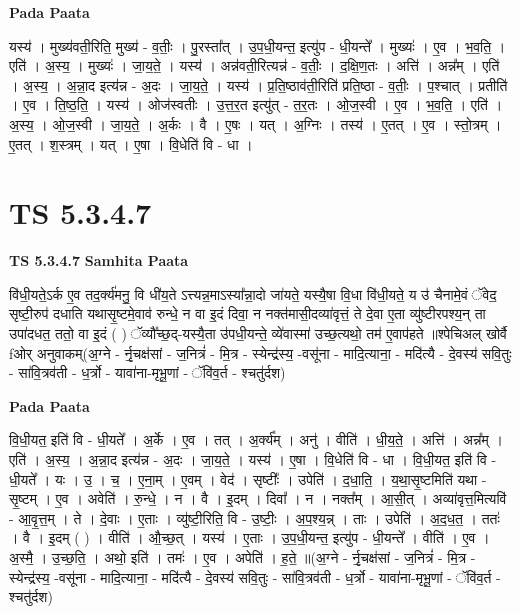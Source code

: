 \documentclass[17pt]{extarticle}
\begin{document}
\textbf{Pada Paata} \newline

यस्य॑ । मुख्य॑वती॒रिति॒ मुख्य॑ - व॒तीः॒ । पु॒रस्ता᳚त् । उ॒प॒धी॒यन्त॒ इत्यु॑प - धी॒यन्ते᳚ । मुख्यः॑ । ए॒व । भ॒व॒ति॒ । एति॑ । अ॒स्य॒ । मुख्यः॑ । जा॒य॒ते॒ । यस्य॑ । अन्न॑वती॒रित्यन्न॑ - व॒तीः॒ । द॒क्षि॒ण॒तः । अत्ति॑ । अन्न᳚म् । एति॑ । अ॒स्य॒ । अ॒न्ना॒द इत्य॑न्न - अ॒दः । जा॒य॒ते॒ । यस्य॑ । प्र॒ति॒ष्ठाव॑ती॒रिति॑ प्रति॒ष्ठा - व॒तीः॒ । प॒श्चात् । प्रतीति॑ । ए॒व । ति॒ष्ठ॒ति॒ । यस्य॑ । ओज॑स्वतीः । उ॒त्त॒र॒त इत्यु॑त् - त॒र॒तः । ओ॒ज॒स्वी । ए॒व । भ॒व॒ति॒ । एति॑ । अ॒स्य॒ । ओ॒ज॒स्वी । जा॒य॒ते॒ । अ॒र्कः । वै । ए॒षः । यत् । अ॒ग्निः । तस्य॑ । ए॒तत् । ए॒व । स्तो॒त्रम् । ए॒तत् । श॒स्त्रम् । यत् । ए॒षा । वि॒धेति॑ वि - धा ।  \newline





\section{ TS 5.3.4.7 }

\textbf{TS 5.3.4.7 } \newline
\textbf{Samhita Paata} \newline

वि॑धी॒यते॒ऽर्क ए॒व तद॒र्क्य॑मनु॒ वि धी॑य॒ते ऽत्त्यन्न॒माऽस्या᳚न्ना॒दो जा॑यते॒ यस्यै॒षा वि॒धा वि॑धी॒यते॒ य उ॑ चैनामे॒वं ॅवेद॒ सृष्टी॒रुप॑ दधाति यथासृ॒ष्टमे॒वाव॑ रुन्धे॒ न वा इ॒दं दिवा॒ न नक्त॑मासी॒दव्या॑वृत्तं॒ ते दे॒वा ए॒ता व्यु॑ष्टीरपश्य॒न् ता उपा॑दधत॒ ततो॒ वा इ॒दं ( ) ॅव्यौ᳚च्छ॒द्-यस्यै॒ता उ॑पधी॒यन्ते॒ व्ये॑वास्मा॑ उच्छ॒त्यथो॒ तम॑ ए॒वाप॑हते ॥श्पेचिअल् खोर्वै fओर् अनुवाकम्(अ॒ग्ने - र्नृ॒चक्ष॑सां - ज॒नित्रं॑ - मि॒त्र - स्येन्द्र॑स्य॒ -वसू॑ना - मादि॒त्याना॒ - मदि॑त्यै - दे॒वस्य॑ सवि॒तुः - सा॑वि॒त्रव॑ती - ध॒र्त्रो - यावा॑ना-मृभू॒णां - ॅवि॑व॒र्त - श्चतु॑र्दश) \newline

\textbf{Pada Paata} \newline

वि॒धी॒यत॒ इति॑ वि - धी॒यते᳚ । अ॒र्के । ए॒व । तत् । अ॒र्क्य᳚म् । अनु॑ । वीति॑ । धी॒य॒ते॒ । अत्ति॑ । अन्न᳚म् । एति॑ । अ॒स्य॒ । अ॒न्ना॒द इत्य॑न्न - अ॒दः । जा॒य॒ते॒ । यस्य॑ । ए॒षा । वि॒धेति॑ वि - धा । वि॒धी॒यत॒ इति॑ वि - धी॒यते᳚ । यः । उ॒ । च॒ । ए॒ना॒म् । ए॒वम् । वेद॑ । सृष्टीः᳚ । उपेति॑ । द॒धा॒ति॒ । य॒था॒सृ॒ष्टमिति॑ यथा - सृ॒ष्टम् । ए॒व । अवेति॑ । रु॒न्धे॒ । न । वै । इ॒दम् । दिवा᳚ । न । नक्त᳚म् । आ॒सी॒त् । अव्या॑वृत्त॒मित्यवि॑ - आ॒वृ॒त्त॒म् । ते । दे॒वाः । ए॒ताः । व्यु॑ष्टी॒रिति॒ वि - उ॒ष्टीः॒ । अ॒प॒श्य॒न्न् । ताः । उपेति॑ । अ॒द॒ध॒त॒ । ततः॑ । वै । इ॒दम् ( ) । वीति॑ । औ॒च्छ॒त् । यस्य॑ । ए॒ताः । उ॒प॒धी॒यन्त॒ इत्यु॑प - धी॒यन्ते᳚ । वीति॑ । ए॒व । अ॒स्मै॒ । उ॒च्छ॒ति॒ । अथो॒ इति॑ । तमः॑ । ए॒व । अपेति॑ । ह॒ते॒ ॥(अ॒ग्ने - र्नृ॒चक्ष॑सां - ज॒नित्रं॑ - मि॒त्र - स्येन्द्र॑स्य॒ -वसू॑ना - मादि॒त्याना॒ - मदि॑त्यै - दे॒वस्य॑ सवि॒तुः - सा॑वि॒त्रव॑ती - ध॒र्त्रो - यावा॑ना-मृभू॒णां - ॅवि॑व॒र्त - श्चतु॑र्दश)  \newline
\end{document}
